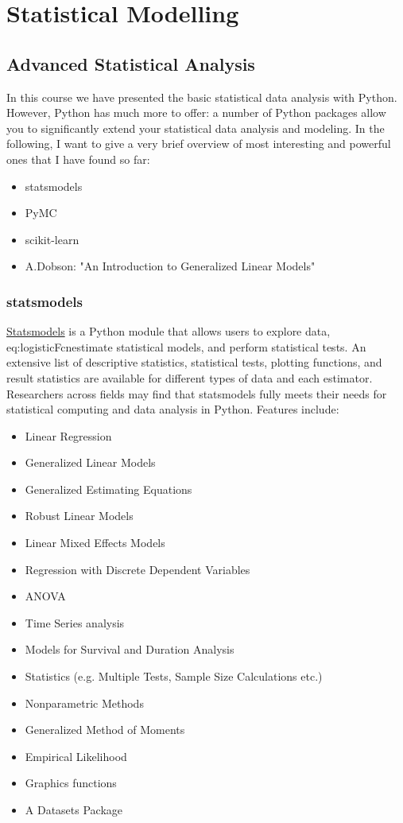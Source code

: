 \part{Statistical Modelling}

\chapter{Advanced Statistical Analysis}

In this course we have presented the basic statistical data analysis with Python. However, Python has much more to offer: a number of Python packages allow you to significantly extend your statistical data analysis and modeling. In the following, I want to give a very brief overview of most interesting and powerful ones that I have found so far:

\begin{itemize}
  \item statsmodels
  \item PyMC
  \item scikit-learn
  \item A.Dobson: "An Introduction to Generalized Linear Models"
\end{itemize}

\section{statsmodels}

\href{http://statsmodels.sourceforge.net/}{Statsmodels} is a Python module that allows users to explore data, eq:logisticFcnestimate statistical models, and perform statistical tests. An extensive list of descriptive statistics, statistical tests, plotting functions, and result statistics are available for different types of data and each estimator. Researchers across fields may find that statsmodels fully meets their needs for statistical computing and data analysis in Python. Features include:

\begin{itemize}
  \item   Linear Regression
  \item   Generalized Linear Models
  \item   Generalized Estimating Equations
  \item   Robust Linear Models
  \item   Linear Mixed Effects Models
  \item   Regression with Discrete Dependent Variables
  \item   ANOVA
  \item   Time Series analysis
  \item   Models for Survival and Duration Analysis
  \item   Statistics (e.g. Multiple Tests, Sample Size Calculations etc.)
  \item   Nonparametric Methods
  \item   Generalized Method of Moments
  \item   Empirical Likelihood
  \item  Graphics functions
  \item  A Datasets Package
\end{itemize}

